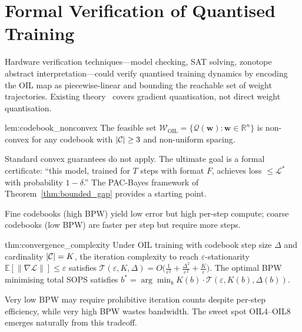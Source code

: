 \section{Formal Verification of Quantised Training}
\label{sec:formal_verification}
Hardware verification techniques---model checking, SAT solving, zonotope
abstract interpretation---could verify quantised training dynamics by
encoding the OIL map as piecewise-linear and bounding the reachable set of
weight trajectories. Existing theory~\cite{alistarh2018} covers gradient
quantisation, not direct weight quantisation.
\begin{mylemma}{lem:codebook_nonconvex}
The feasible set $\mathcal{W}_{\text{OIL}} = \{\mathcal{Q}(\mathbf{w}) :
\mathbf{w} \in \mathbb{R}^n\}$ is non-convex for any codebook with
$|\mathcal{C}| \geq 3$ and non-uniform spacing.
\end{mylemma}
Standard convex guarantees do not apply. The ultimate goal is a formal
certificate: ``this model, trained for $T$ steps with format $F$, achieves
loss $\leq \mathcal{L}^*$ with probability $1-\delta$.'' The PAC-Bayes
framework of Theorem~\ref{thm:bounded_gap} provides a starting point.

Fine codebooks (high BPW) yield low error but high per-step compute; coarse
codebooks (low BPW) are faster per step but require more steps.
\begin{mythm}{thm:convergence_complexity}
Under OIL training with codebook step size $\Delta$ and cardinality
$|\mathcal{C}| = K$, the iteration complexity to reach $\varepsilon$-stationarity
$\mathbb{E}[\|\nabla \mathcal{L}\|] \leq \varepsilon$ satisfies
$\mathcal{T}(\varepsilon, K, \Delta) = O\big(
\frac{1}{\varepsilon^2} + \frac{\Delta^2}{\varepsilon^2} +
\frac{K}{\varepsilon} \big).$
The optimal BPW minimising total SOPS satisfies $b^* = \arg\min_b
K(b) \cdot \mathcal{T}(\varepsilon, K(b), \Delta(b))$.
\end{mythm}
Very low BPW may require prohibitive iteration counts despite per-step
efficiency, while very high BPW wastes bandwidth. The sweet spot
OIL4--OIL8 emerges naturally from this tradeoff.

